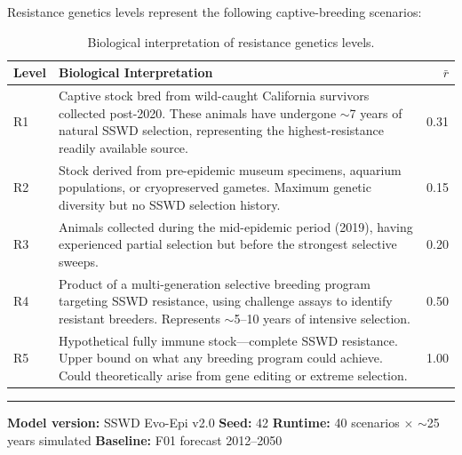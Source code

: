 \documentclass[11pt,a4paper]{article}
\newcommand{\rbar}{\ensuremath{\bar{r}}}
\begin{document}
Resistance genetics levels represent the following captive-breeding scenarios:

\begin{table}[H]
\centering
\begin{tabular}{lp{9cm}r}
\toprule
\textbf{Level} & \textbf{Biological Interpretation} & $\rbar$ \\
\midrule
R1 & Captive stock bred from wild-caught California survivors collected post-2020. These animals have undergone ${\sim}$7 years of natural SSWD selection, representing the highest-resistance readily available source. & 0.31 \\
R2 & Stock derived from pre-epidemic museum specimens, aquarium populations, or cryopreserved gametes. Maximum genetic diversity but no SSWD selection history. & 0.15 \\
R3 & Animals collected during the mid-epidemic period (2019), having experienced partial selection but before the strongest selective sweeps. & 0.20 \\
R4 & Product of a multi-generation selective breeding program targeting SSWD resistance, using challenge assays to identify resistant breeders. Represents ${\sim}$5--10 years of intensive selection. & 0.50 \\
R5 & Hypothetical fully immune stock---complete SSWD resistance. Upper bound on what any breeding program could achieve. Could theoretically arise from gene editing or extreme selection. & 1.00 \\
\bottomrule
\end{tabular}
\caption{Biological interpretation of resistance genetics levels.}
\label{tab:genetics}
\end{table}

\bigskip
\noindent\rule{\textwidth}{0.4pt}

\small
\noindent\textbf{Model version:} SSWD Evo-Epi v2.0 \quad
\textbf{Seed:} 42 \quad
\textbf{Runtime:} 40 scenarios $\times$ ${\sim}$25 years simulated \quad
\textbf{Baseline:} F01 forecast 2012--2050
\end{document}
